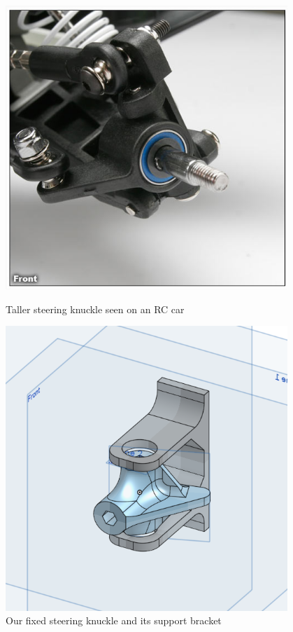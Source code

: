 \begin{figure}[ht]
\centering
\begin{minipage}[b]{.48\textwidth}
  \centering
  \includegraphics[width=0.95\textwidth]{Meetings/October/10-22-22/10-02-22_CAD_Figure1.PNG}
  \caption{Taller steering knuckle seen on an RC car}
  \label{fig:pic1}
\end{minipage}%
\hfill%
\begin{minipage}[b]{.48\textwidth}
  \centering
  \includegraphics[width=0.95\textwidth]{Meetings/October/10-22-22/10-02-22_CAD_Figure2.PNG}
  \caption{Our fixed steering knuckle and its support bracket}
  \label{fig:pic2}
\end{minipage}
\end{figure}
